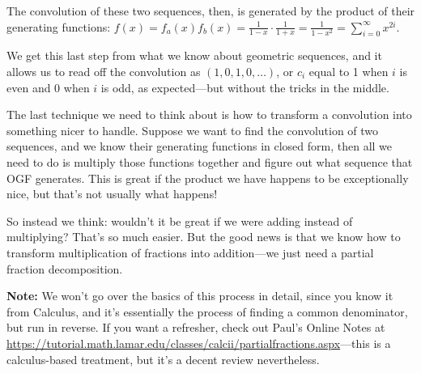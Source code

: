 \documentclass{article}
\theoremstyle{definition}
\begin{document}
The convolution of these two sequences, then, is generated by the product of their generating functions: $f(x)=f_{a}(x) f_{b}(x)=\frac{1}{1-x} \cdot \frac{1}{1+x}=\frac{1}{1-x^{2}}=\sum_{i=0}^{\infty} x^{2 i}$.

We get this last step from what we know about geometric sequences, and it allows us to read off the convolution as $(1,0,1,0, \ldots)$, or $c_{i}$ equal to 1 when $i$ is even and 0 when $i$ is odd, as expected---but without the tricks in the middle.

The last technique we need to think about is how to transform a convolution into something nicer to handle. Suppose we want to find the convolution of two sequences, and we know their generating functions in closed form, then all we need to do is multiply those functions together and figure out what sequence that OGF generates. This is great if the product we have happens to be exceptionally nice, but that's not usually what happens!

So instead we think: wouldn't it be great if we were adding instead of multiplying? That's so much easier. But the good news is that we know how to transform multiplication of fractions into addition---we just need a partial fraction decomposition.

\textbf{Note:} We won't go over the basics of this process in detail, since you know it from Calculus, and it's essentially the process of finding a common denominator, but run in reverse. If you want a refresher, check out Paul's Online Notes at \href{https://tutorial.math.lamar.edu/classes/calcii/partialfractions.aspx}{https://tutorial.math.lamar.edu/classes/calcii/partialfractions.aspx}---this is a calculus-based treatment, but it's a decent review nevertheless.
\end{document}
